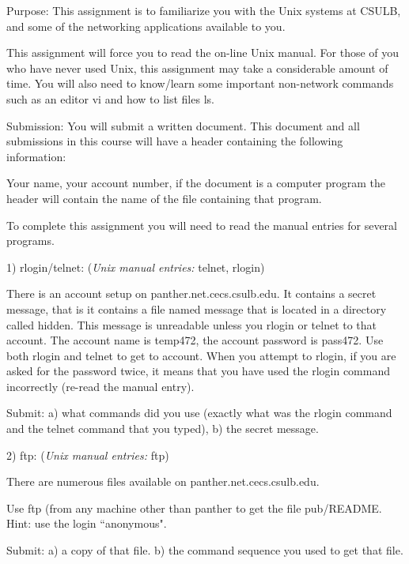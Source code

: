 

\parindent 0pt

Purpose: This assignment is to familiarize you with the Unix systems at
CSULB, and some of the networking applications available to you.

This assignment will force you to read the on-line Unix manual.
For those of you who have never used Unix, this assignment may take a
considerable amount of time.
You will also need to know/learn some important non-network commands such as 
an editor {\ltt{}vi} and how to list files {\ltt{}ls}.

Submission: You will submit a written document.
This document and all submissions in this course will have a header
containing the following information:

Your name, your account number, if the document is a computer program
the header will contain the name of the file containing that program.

To complete this assignment you will need to read the manual entries
for several programs.

1) rlogin/telnet: ({\it Unix manual entries:} {\ltt{}telnet}, {\ltt{}rlogin})

There is an account setup on panther.net.cecs.csulb.edu.
It contains a secret message, 
that is it contains a file named {\ltt{}message} that is located
in a directory called {\ltt{}hidden}. This message is
unreadable unless you rlogin or telnet to that account.
The account name is {\ltt{}temp472}, the account password is {\ltt{}pass472}.
Use both {\ltt{}rlogin} and {\ltt{}telnet} to get to account.
When you attempt to rlogin, if you are asked for the password twice, it means
that you have used the rlogin command incorrectly (re-read the manual entry).

Submit: 
a) what commands did you use (exactly what was the {\ltt{}rlogin} command
and the {\ltt{}telnet} command that you typed),
b) the secret message.

2) ftp: 
({\it Unix manual entries:} {\ltt{}ftp})

There are numerous files available on {\ltt{}panther.net.cecs.csulb.edu}.

Use ftp (from any machine other than {\ltt{}panther} to get the file 
pub/README.
Hint: use the login ``anonymous".

Submit: 
a) a copy of that file.
b) the command sequence you used to get that file.

